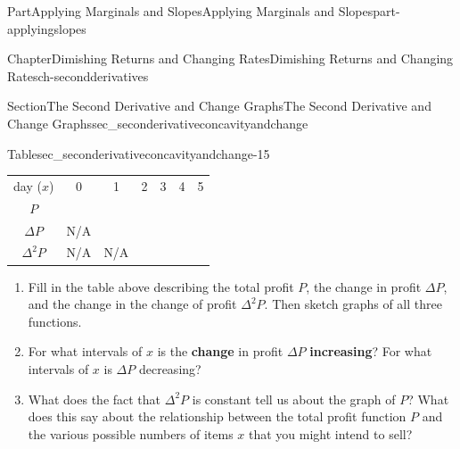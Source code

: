 \documentclass[oneside,10pt,]{tufte-book}
\newcommand{\tabularfont}{\relax}
\newcommand{\terminology}[1]{\textbf{#1}}
\numberwithin{equation}{chapter}
\begin{document}
\begin{partptx}{Part}{Applying Marginals and Slopes}{}{Applying Marginals and Slopes}{}{}{part-applyingslopes}
\begin{chapterptx}{Chapter}{Dimishing Returns and Changing Rates}{}{Dimishing Returns and Changing Rates}{}{}{ch-secondderivatives}
\begin{sectionptx}{Section}{The Second Derivative and Change Graphs}{}{The Second Derivative and Change Graphs}{}{}{sec_seconderivativeconcavityandchange}
\begin{image}{0}{1}{0}{}
{\begin{tikzpicture}[xscale=\xscale,yscale=\yscale]
	
\end{tikzpicture}
}%
\end{image}%
\begin{tableptx}{Table}{\textbf{}}{sec_seconderivativeconcavityandchange-15}{}%
\centering%
{\tabularfont%
\begin{tabular}{lllllll}
\multicolumn{1}{c}{day (\(x\))}&\multicolumn{1}{c}{0}&\multicolumn{1}{c}{1}&\multicolumn{1}{c}{2}&\multicolumn{1}{c}{3}&\multicolumn{1}{c}{4}&\multicolumn{1}{c}{5}\tabularnewline[0pt]
\multicolumn{1}{c}{\(P\)}&\multicolumn{1}{c}{}&\multicolumn{1}{c}{}&\multicolumn{1}{c}{}&\multicolumn{1}{c}{}&\multicolumn{1}{c}{}&\multicolumn{1}{c}{}\tabularnewline[0pt]
\multicolumn{1}{c}{\(\Delta P\)}&\multicolumn{1}{c}{N\slash{}A}&\multicolumn{1}{c}{}&\multicolumn{1}{c}{}&\multicolumn{1}{c}{}&\multicolumn{1}{c}{}&\multicolumn{1}{c}{}\tabularnewline[0pt]
\multicolumn{1}{c}{\(\Delta^2 P\)}&\multicolumn{1}{c}{N\slash{}A}&\multicolumn{1}{c}{N\slash{}A}&\multicolumn{1}{c}{}&\multicolumn{1}{c}{}&\multicolumn{1}{c}{}&\multicolumn{1}{c}{}
\end{tabular}
}%
\end{tableptx}%
%
\begin{enumerate}
\item{}Fill in the table above describing the total profit \(P\), the change in profit \(\Delta P\), and the change in the change of profit \(\Delta^2 P\). Then sketch graphs of all three functions.%
\item{}For what intervals of \(x\) is the \terminology{change} in profit \(\Delta P\) \terminology{increasing}? For what intervals of \(x\) is \(\Delta P\) decreasing?%
\item{}What does the fact that \(\Delta^2 P\) is constant tell us about the graph of \(P\)? What does this say about the relationship between the total profit function \(P\) and the various possible numbers of items \(x\) that you might intend to sell?%
\end{enumerate}
%
\end{sectionptx}
\end{chapterptx}
\end{partptx}
%
%
\typeout{************************************************}
\typeout{************************************************}
%
\end{document}
